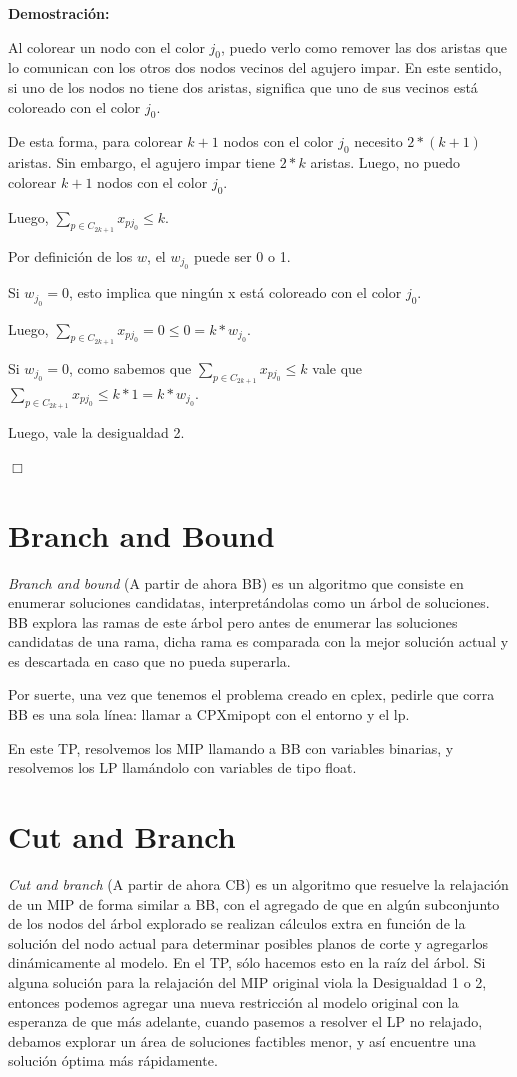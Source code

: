 \documentclass[a4paper, 10pt, twoside]{article}
\begin{document}
\textbf{Demostración:}

Al colorear un nodo con el color $j_0$, puedo verlo como remover las dos aristas que lo comunican con los otros dos nodos vecinos del agujero impar. En este sentido, si uno de los nodos no tiene dos aristas, significa que uno de sus vecinos está coloreado con el color $j_0$.

De esta forma, para colorear $k+1$ nodos con el color $j_0$ necesito $2 * (k+1)$ aristas. Sin embargo, el agujero impar tiene $2 * k$ aristas. Luego, no puedo colorear $k+1$ nodos con el color $j_0$.

Luego, $\sum_{p \in C_{2k+1}} x_{pj_0} \leq k$.

Por definición de los $w$, el $w_{j_0}$ puede ser 0 o 1.

Si $w_{j_0} = 0$, esto implica que ningún x está coloreado con el color $j_0$.

Luego, $\sum_{p \in C_{2k+1}} x_{pj_0} = 0 \leq 0 = k * w_{j_0}$.

Si $w_{j_0} = 0$, como sabemos que $\sum_{p \in C_{2k+1}} x_{pj_0} \leq k$ vale que $\sum_{p \in C_{2k+1}} x_{pj_0} \leq k * 1 = k * w_{j_0}$.
 
Luego, vale la desigualdad 2.

\hfill \ensuremath{\Box}

\section{Branch and Bound}

\emph{Branch and bound} (A partir de ahora BB) es un algoritmo que consiste en enumerar soluciones candidatas, interpretándolas como un árbol de soluciones. BB explora las ramas de este árbol pero antes de enumerar las soluciones candidatas de una rama, dicha rama es comparada con la mejor solución actual y es descartada en caso que no pueda superarla.

Por suerte, una vez que tenemos el problema creado en cplex, pedirle que corra BB es una sola línea: llamar a CPXmipopt con el entorno y el lp.

En este TP, resolvemos los MIP llamando a BB con variables binarias, y resolvemos los LP llamándolo con variables de tipo float.

\section{Cut and Branch}

\emph{Cut and branch} (A partir de ahora CB) es un algoritmo que resuelve la relajación de un MIP de forma similar a BB, con el agregado de que en algún subconjunto de los nodos del árbol explorado se realizan cálculos extra en función de la solución del nodo actual para determinar posibles planos de corte y agregarlos dinámicamente al modelo. En el TP, sólo hacemos esto en la raíz del árbol. Si alguna solución para la relajación del MIP original viola la Desigualdad 1 o 2, entonces podemos agregar una nueva restricción al modelo original con la esperanza de que más adelante, cuando pasemos a resolver el LP no relajado, debamos explorar un área de soluciones factibles menor, y así encuentre una solución óptima más rápidamente.
\end{document}
